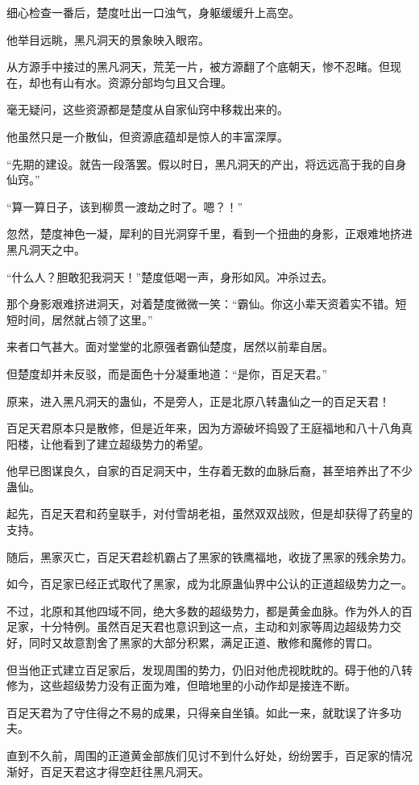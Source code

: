 \begin{this_body}
细心检查一番后，楚度吐出一口浊气，身躯缓缓升上高空。

他举目远眺，黑凡洞天的景象映入眼帘。

从方源手中接过的黑凡洞天，荒芜一片，被方源翻了个底朝天，惨不忍睹。但现在，却也有山有水。资源分部均匀且又合理。

毫无疑问，这些资源都是楚度从自家仙窍中移栽出来的。

他虽然只是一介散仙，但资源底蕴却是惊人的丰富深厚。

“先期的建设。就告一段落罢。假以时日，黑凡洞天的产出，将远远高于我的自身仙窍。”

“算一算日子，该到柳贯一渡劫之时了。嗯？！”

忽然，楚度神色一凝，犀利的目光洞穿千里，看到一个扭曲的身影，正艰难地挤进黑凡洞天之中。

“什么人？胆敢犯我洞天！”楚度低喝一声，身形如风。冲杀过去。

那个身影艰难挤进洞天，对着楚度微微一笑：“霸仙。你这小辈天资着实不错。短短时间，居然就占领了这里。”

来者口气甚大。面对堂堂的北原强者霸仙楚度，居然以前辈自居。

但楚度却并未反驳，而是面色十分凝重地道：“是你，百足天君。”

原来，进入黑凡洞天的蛊仙，不是旁人，正是北原八转蛊仙之一的百足天君！

百足天君原本只是散修，但是近年来，因为方源破坏捣毁了王庭福地和八十八角真阳楼，让他看到了建立超级势力的希望。

他早已图谋良久，自家的百足洞天中，生存着无数的血脉后裔，甚至培养出了不少蛊仙。

起先，百足天君和药皇联手，对付雪胡老祖，虽然双双战败，但是却获得了药皇的支持。

随后，黑家灭亡，百足天君趁机霸占了黑家的铁鹰福地，收拢了黑家的残余势力。

如今，百足家已经正式取代了黑家，成为北原蛊仙界中公认的正道超级势力之一。

不过，北原和其他四域不同，绝大多数的超级势力，都是黄金血脉。作为外人的百足家，十分特例。虽然百足天君也意识到这一点，主动和刘家等周边超级势力交好，同时又故意割舍了黑家的大部分积累，满足正道、散修和魔修的胃口。

但当他正式建立百足家后，发现周围的势力，仍旧对他虎视眈眈的。碍于他的八转修为，这些超级势力没有正面为难，但暗地里的小动作却是接连不断。

百足天君为了守住得之不易的成果，只得亲自坐镇。如此一来，就耽误了许多功夫。

直到不久前，周围的正道黄金部族们见讨不到什么好处，纷纷罢手，百足家的情况渐好，百足天君这才得空赶往黑凡洞天。


\end{this_body}
